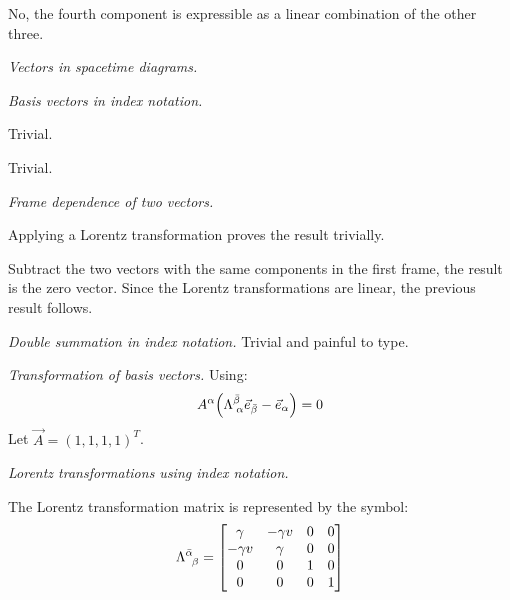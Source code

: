 \documentclass{report}
\begin{document}
\begin{subquests}
\begin{subquests}
		\item No, the fourth component is expressible as a linear combination of the other three.
	\end{subquests}

	\item \emph{Vectors in spacetime diagrams.}

	\item \emph{Basis vectors in index notation.}
	\begin{subquests}
		\item Trivial.

		\item Trivial.
	\end{subquests}

	\item \emph{Frame dependence of two vectors.}
	\begin{subquests}
		\item Applying a Lorentz transformation proves the result trivially.

		\item Subtract the two vectors with the same components in the first frame, the result is the zero vector. Since the Lorentz transformations are linear, the previous result follows.
	\end{subquests}

	\item \emph{Double summation in index notation.} Trivial and painful to type.

	\item \emph{Transformation of basis vectors.}
	Using:
	\begin{gather*}
		A^{\alpha}\pqty{\Lambda^{\bar \beta}_{\;\alpha}\vec{e}_{\bar \beta} - \vec{e}_{\alpha}} = 0
	\end{gather*}
	Let ${\vec A} = (1, 1, 1 , 1)^T$.

	\item \emph{Lorentz transformations using index notation.}
	\begin{subquests}
		\item
		The Lorentz transformation matrix is represented by the symbol:
		\begin{gather*}
			\Lambda^{\bar{\alpha}}_{\;\;\beta} = 
			\mqty[
				\gamma & -\gamma v & 0 & 0 \\
				-\gamma v & \gamma & 0 & 0 \\
				0 & 0 & 1 & 0 \\
				0 & 0 & 0 & 1
			]
		\end{gather*}


\end{subquests}
\end{subquests}
\end{document}
